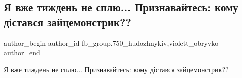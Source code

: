  
 
 
 
 

\subsection{Я вже тиждень не сплю... Признавайтесь: кому дістався зайцемонстрик??}
\label{sec:19_03_2018.fb.fb_group.750_hudozhnykiv.1.ja_vzhe_tyzhden_ne_splju}
 
\ifcmt
 author_begin
   author_id fb_group.750_hudozhnykiv,violett_obryvko
 author_end
\fi

Я вже тиждень не сплю... Признавайтесь: кому дістався зайцемонстрик?? 🤔

